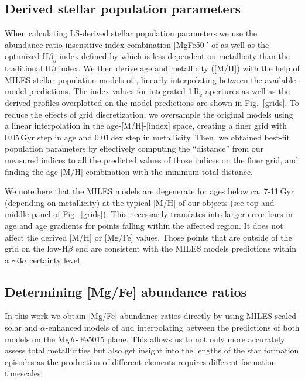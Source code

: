 \documentclass[useAMS,usenatbib]{mn2e}
\newcommand{\re}{$\mathrm{R_e}$}
\newcommand{\hb}{H$\beta$}
\newcommand{\hbo}{H$\beta_o$}
\newcommand{\mgb}{Mg\,$b$}
\begin{document}
\subsection{Derived stellar population parameters}

When calculating LS-derived stellar population parameters we use the abundance-ratio insensitive index combination [MgFe50]' of \cite{kuntschner:2010} as well as the optimized {\hbo} index defined by \cite{cervantes:2009} which is less dependent on metallicity than the traditional {\hb} index. We then derive age and metallicity ([M/H]) with the help of MILES stellar population models of \cite{vazdekis:2015}, linearly interpolating between the available model predictions. The index values for integrated 1\,{\re} apertures as well as the derived profiles overplotted on the model predictions are shown in Fig.~\ref{grids}. To reduce the effects of grid discretization, we oversample the original models using a  linear interpolation in the age-[M/H]-[index] space, creating a finer grid with 0.05\,Gyr step in age and 0.01\,dex step in metallicity. Then, we obtained best-fit population parameters by effectively computing the ``distance'' from our measured indices to all the predicted values of those indices on the finer grid, and finding the age-[M/H] combination with the minimum total distance.

We note here that the MILES models are degenerate for ages below ca. 7-11\,Gyr (depending on metallicity) at the typical [M/H] of our objects (see top and middle panel of Fig.~\ref{grids}). This necessarily translates into larger error bars in age and age gradients for points falling within the affected region. It does not affect the derived [M/H] or [Mg/Fe] values. Those points that are outside of the grid on the low-{\hb} end are consistent with the MILES models predictions within a $\sim 3 \sigma$ certainty level. 

\subsection{Determining [Mg/Fe] abundance ratios}
\label{mgfe-calc}

In this work we obtain [Mg/Fe] abundance ratios directly by using MILES scaled-solar and $\alpha$-enhanced models of \cite{vazdekis:2015}  and interpolating between the predictions of both models on the {\mgb}\,-\,Fe5015 plane. This allows us to not only more accurately assess total metallicities but also get insight into the lengths of the star formation episodes as the production of different elements requires different formation timescales. 
\end{document}
